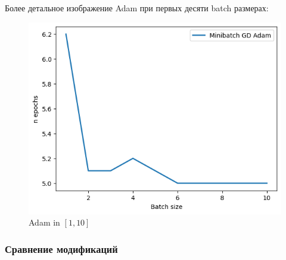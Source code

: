 \documentclass[12pt, a4paper, oneside, final]{article}
\begin{document}
	Более детальное изображение Adam при первых десяти batch размерах:
	\begin{figure}[H]
		\centering
		\includegraphics[scale = 0.9]{Image/T3_ADAM_1_10.png}
		\caption*{Adam in $[1, 10]$}
	\end{figure}
	\subsubsection*{Сравнение модификаций}
\end{document}
